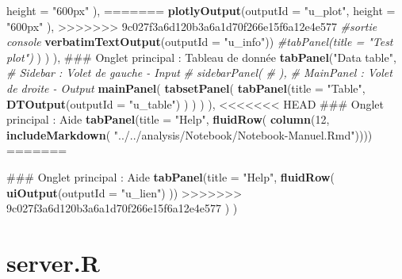 \documentclass[]{report}
\newenvironment{Shaded}{\begin{snugshade}}{\end{snugshade}}
\newcommand{\KeywordTok}[1]{\textcolor[rgb]{0.13,0.29,0.53}{\textbf{#1}}}
\newcommand{\DataTypeTok}[1]{\textcolor[rgb]{0.13,0.29,0.53}{#1}}
\newcommand{\DecValTok}[1]{\textcolor[rgb]{0.00,0.00,0.81}{#1}}
\newcommand{\StringTok}[1]{\textcolor[rgb]{0.31,0.60,0.02}{#1}}
\newcommand{\CommentTok}[1]{\textcolor[rgb]{0.56,0.35,0.01}{\textit{#1}}}
\newcommand{\NormalTok}[1]{#1}
\begin{document}
\begin{Shaded}
\begin{Highlighting}[]
                                       \DataTypeTok{height =} \StringTok{"600px"}\NormalTok{ ),}
=======
                          \KeywordTok{plotlyOutput}\NormalTok{(}\DataTypeTok{outputId =} \StringTok{"u_plot"}\NormalTok{, }\DataTypeTok{height =} \StringTok{"600px"}\NormalTok{ ),}
>>>>>>> 9c027f3a6d120b3a6a1d70f266e15f6a12e4e577
                          \CommentTok{#sortie console}
                          \KeywordTok{verbatimTextOutput}\NormalTok{(}\DataTypeTok{outputId =} \StringTok{"u_info"}\NormalTok{))}
                 \CommentTok{#tabPanel(title = "Test plot")}
\NormalTok{               )}
\NormalTok{             )}
\NormalTok{    ),}
\NormalTok{    ### Onglet principal : Tableau de donnée}
    \KeywordTok{tabPanel}\NormalTok{(}\StringTok{"Data table"}\NormalTok{,}
             \CommentTok{# Sidebar : Volet de gauche - Input}
             \CommentTok{# sidebarPanel(}
             \CommentTok{# ),}
             \CommentTok{# MainPanel : Volet de droite - Output}
             \KeywordTok{mainPanel}\NormalTok{(}
               \KeywordTok{tabsetPanel}\NormalTok{(}
                 \KeywordTok{tabPanel}\NormalTok{(}\DataTypeTok{title =} \StringTok{"Table"}\NormalTok{, }\KeywordTok{DTOutput}\NormalTok{(}\DataTypeTok{outputId =} \StringTok{"u_table"}\NormalTok{)}
\NormalTok{                          )}
\NormalTok{               )}
\NormalTok{             )}
\NormalTok{    ),}
<<<<<<< HEAD
\NormalTok{    ### Onglet principal : Aide}
    \KeywordTok{tabPanel}\NormalTok{(}\DataTypeTok{title =} \StringTok{"Help"}\NormalTok{,}
             \KeywordTok{fluidRow}\NormalTok{(}
               \KeywordTok{column}\NormalTok{(}\DecValTok{12}\NormalTok{, }\KeywordTok{includeMarkdown}\NormalTok{(}
                 \StringTok{"../../analysis/Notebook/Notebook-Manuel.Rmd"}\NormalTok{))))}
=======
    
\NormalTok{    ### Onglet principal : Aide}
    \KeywordTok{tabPanel}\NormalTok{(}\DataTypeTok{title =} \StringTok{"Help"}\NormalTok{,}
             \KeywordTok{fluidRow}\NormalTok{(}
               \KeywordTok{uiOutput}\NormalTok{(}\DataTypeTok{outputId =} \StringTok{"u_lien"}\NormalTok{)}
\NormalTok{             ))}
>>>>>>> 9c027f3a6d120b3a6a1d70f266e15f6a12e4e577
\NormalTok{  )}
\NormalTok{)}
\end{Highlighting}
\end{Shaded}

\section{server.R}\label{server.r}
\end{document}
